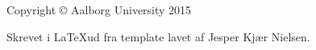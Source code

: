 \thispagestyle{empty}
{\small
\strut\vfill %
\noindent Copyright \copyright{} Aalborg University 2015\par
\vspace{0.2cm}
\noindent Skrevet i \LaTeX ud fra template lavet af Jesper Kjær Nielsen. 
}
\clearpage


